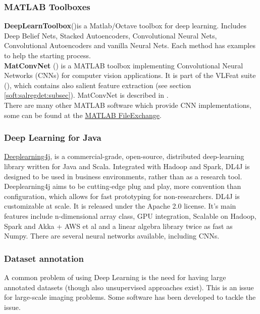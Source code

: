 {\subsubsection{MATLAB Toolboxes}
{\bf DeepLearnToolbox}(\cite{deeplearntoolbox_soft})is a Matlab/Octave toolbox for deep learning. Includes Deep Belief Nets, Stacked Autoencoders, Convolutional Neural Nets, Convolutional Autoencoders and vanilla Neural Nets. Each method has examples to help the starting process.\\
{\bf MatConvNet} (\cite{matconvnet_soft}) is a MATLAB toolbox implementing Convolutional Neural Networks (CNNs) for computer vision applications. It is part of the VLFeat suite (\cite{vlfeat_soft}), which contains also salient feature extraction (see section \ref{soft:salregdet:subsec}). MatConvNet is described in \cite{matconvnet_paper}.\\
 There are many other MATLAB software which provide CNN implementations, some can be found at the \href{http://www.mathworks.com/matlabcentral/fileexchange/24291-cnn-convolutional-neural-network-class}{MATLAB FileExchange}.

\subsubsection{Deep Learning for Java}
\href{http://deeplearning4j.org/}{Deeplearning4j}, \cite{dl4j} is a commercial-grade, open-source, distributed deep-learning library written for Java and Scala. Integrated with Hadoop and Spark, DL4J is designed to be used in business environments, rather than as a research tool. 
Deeplearning4j aims to be cutting-edge plug and play, more convention than configuration, which allows for fast prototyping for non-researchers. DL4J is customizable at scale. It is released under the Apache 2.0 license. It's main features include n-dimensional array class, GPU integration,  Scalable on Hadoop, Spark and Akka + AWS et al and a linear algebra library twice as fast as Numpy. There are several neural networks available, including CNNs.


\subsubsection{Dataset annotation}\label{subsec:dbannot}
A common problem of using Deep Learning is the need for having large annotated datasets (though also unsupervised approaches exist). This is an issue for large-scale imaging problems. Some software has been developed to tackle the issue.

}
